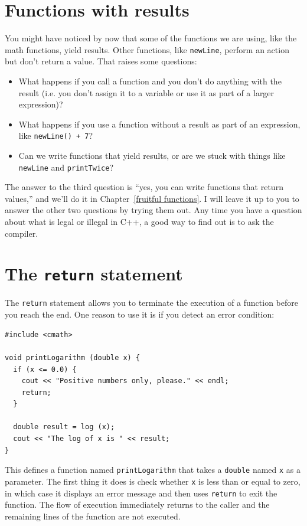 \section {Functions with results}

You might have noticed by now that some of the functions we are using,
like the math functions, yield results.  Other functions,
like {\tt newLine}, perform an action but
don't return a value.  That raises some questions:

\begin{itemize}

\item What happens if you call a function and you don't
do anything with the result (i.e. you don't assign it to
a variable or use it as part of a larger expression)?

\item What happens if you use a function without a result as part
of an expression, like {\tt newLine() + 7}?

\item Can we write functions that yield results, or are we
stuck with things like {\tt newLine} and {\tt printTwice}?

\end{itemize}

The answer to the third question is ``yes, you can write functions that
return values,'' and we'll do it in Chapter~\ref{fruitful functions}.  I will
leave it up to you to answer the other two questions by trying them
out.  Any time you have a question about what is legal or
illegal in C++, a good way to find out is to ask the compiler.

\section{The {\tt return} statement}

The {\tt return} statement allows you to terminate the execution
of a function before you reach the end.  One reason to use it
is if you detect an error condition:

\begin{verbatim}
#include <cmath>

void printLogarithm (double x) {
  if (x <= 0.0) {
    cout << "Positive numbers only, please." << endl;
    return;
  }

  double result = log (x);
  cout << "The log of x is " << result;
}
\end{verbatim}
%
This defines a function named {\tt printLogarithm} that takes
a {\tt double} named {\tt x} as a parameter.  The first thing
it does is check whether {\tt x} is less than or equal to
zero, in which case it displays an error message and then uses
{\tt return} to exit the function.  The flow of execution
immediately returns to the caller and the remaining lines of
the function are not executed.

